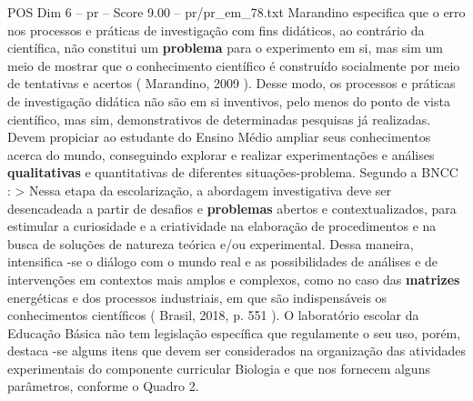 \begin{textsample}{POS Dim 6 – pr – Score 9.00 – pr/pr\_em\_78.txt}
Marandino especifica que o erro nos processos e práticas de investigação com fins didáticos, ao contrário da científica, não constitui um \textbf{problema} para o experimento em si, mas sim um meio de mostrar que o conhecimento científico é construído socialmente por meio de tentativas e acertos ( Marandino, 2009 ).
Desse modo, os processos e práticas de investigação didática não são em si inventivos, pelo menos do ponto de vista científico, mas sim, demonstrativos de determinadas pesquisas já realizadas.
Devem propiciar ao estudante do Ensino Médio ampliar seus conhecimentos acerca do mundo, conseguindo explorar e realizar experimentações e análises \textbf{qualitativas} e quantitativas de diferentes situações-problema.
Segundo a BNCC : > Nessa etapa da escolarização, a abordagem investigativa deve ser desencadeada a partir de desafios e \textbf{problemas} abertos e contextualizados, para estimular a curiosidade e a criatividade na elaboração de procedimentos e na busca de soluções de natureza teórica e/ou experimental.
Dessa maneira, intensifica -se o diálogo com o mundo real e as possibilidades de análises e de intervenções em contextos mais amplos e complexos, como no caso das \textbf{matrizes} energéticas e dos processos industriais, em que são indispensáveis os conhecimentos científicos ( Brasil, 2018, p. 551 ).
O laboratório escolar da Educação Básica não tem legislação específica que regulamente o seu uso, porém, destaca -se alguns itens que devem ser considerados na organização das atividades experimentais do componente curricular Biologia e que nos fornecem alguns parâmetros, conforme o Quadro 2.

\end{textsample}
